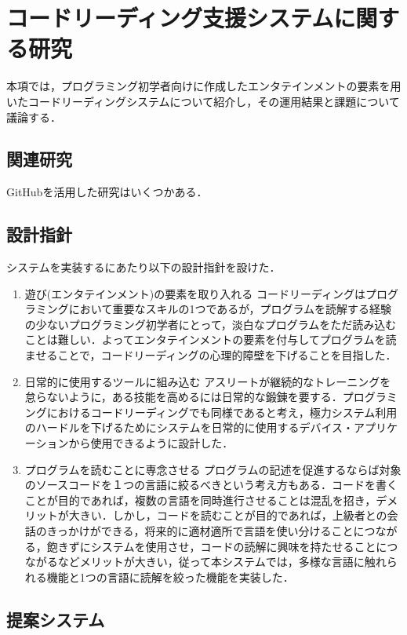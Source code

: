 \section{コードリーディング支援システムに関する研究}
本項では，プログラミング初学者向けに作成したエンタテインメントの要素を用いたコードリーディングシステムについて紹介し，その運用結果と課題について議論する．

\subsection{関連研究}

GitHubを活用した研究はいくつかある．

\subsection{設計指針}
システムを実装するにあたり以下の設計指針を設けた．
\begin{enumerate}
  \item 遊び(エンタテインメント)の要素を取り入れる
  コードリーディングはプログラミングにおいて重要なスキルの1つであるが，プログラムを読解する経験の少ないプログラミング初学者にとって，淡白なプログラムをただ読み込むことは難しい．よってエンタテインメントの要素を付与してプログラムを読ませることで，コードリーディングの心理的障壁を下げることを目指した．
  \item 日常的に使用するツールに組み込む
  アスリートが継続的なトレーニングを怠らないように，ある技能を高めるには日常的な鍛錬を要する．プログラミングにおけるコードリーディングでも同様であると考え，極力システム利用のハードルを下げるためにシステムを日常的に使用するデバイス・アプリケーションから使用できるように設計した．
  \item プログラムを読むことに専念させる
  プログラムの記述を促進するならば対象のソースコードを１つの言語に絞るべきという考え方もある．コードを書くことが目的であれば，複数の言語を同時進行させることは混乱を招き，デメリットが大きい．しかし，コードを読むことが目的であれば，上級者との会話のきっかけができる，将来的に適材適所で言語を使い分けることにつながる，飽きずにシステムを使用させ，コードの読解に興味を持たせることにつながるなどメリットが大きい，従って本システムでは，多様な言語に触れられる機能と1つの言語に読解を絞った機能を実装した．
\end{enumerate}

\subsection{提案システム}
